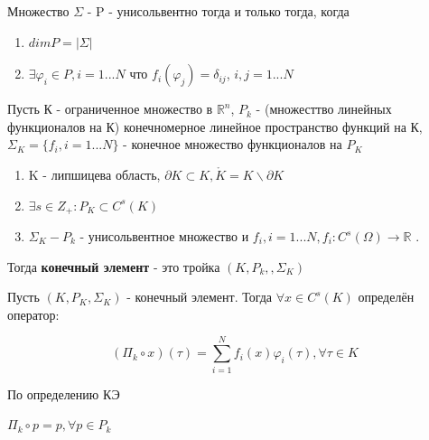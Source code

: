 \documentclass[__main__.tex]{subfiles}
\begin{document}
\begin{theorem}
	Множество $\Sigma$ - P - унисольвентно тогда и только тогда, когда 
	
	\begin{enumerate}
		\item $dim P = \left|\Sigma\right|$
		
		\item  $\exists \varphi_i \in P, i = 1... N$ что $f_i \left(\varphi_j\right) = \delta_{ij}$, $i,j = 1 ...N$
	\end{enumerate}
\end{theorem}

\begin{definition}
Пусть К - ограниченное множество в $\mathbb{R}^n$, $P_k$ - (множесттво линейных функционалов на К) конечномерное линейное пространство функций на К, $\Sigma_K = \{f_i, i = 1 ... N\}$ - конечное множество функционалов на $P_K$

\begin{enumerate}
	\item K - липшицева область, $\partial K \subset K, \mathring{K} = K \backslash \partial K$ 
	
	\item  $\exists s \in Z_+:P_K \subset C^s\left(K\right)$
	
	\item $\Sigma_K - P_k$ - унисольвентное множество и $f_i, i= 1...N, f_i:C^s\left(\Omega\right) \rightarrow \mathbb{R}$ .
\end{enumerate}

Тогда \textbf{конечный элемент} - это тройка $\left(K, P_k,, \Sigma_K\right)$
\end{definition}

\begin{definition}
	Пусть $\left(K, P_K, \Sigma_K\right)$ - конечный элемент. Тогда $\forall x \in C^s\left(K\right)$ определён оператор:
	
	$$
	\left(\Pi_k \circ x\right) \left(\tau\right) = \sum_{i = 1}^{N}f_i\left(x\right)\varphi_i\left(\tau\right), \forall \tau \in K
	$$
	
	По определению КЭ
	
	$\Pi_k \circ p = p, \forall p \in P_k$
\end{definition}
\end{document}
